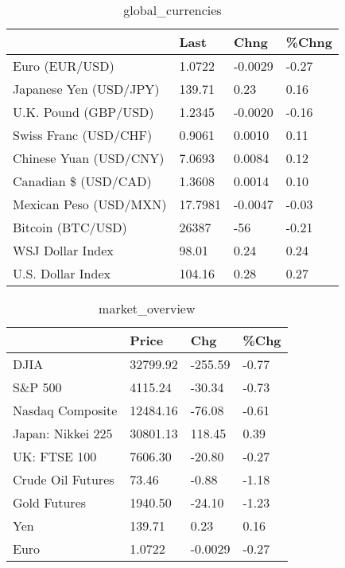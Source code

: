 \documentclass{article}%
\begin{document}
%


\begin{table}[htbp]%
\caption{global\_currencies}%
\centering%
\begin{adjustbox}{width=1\textwidth}%
\begin{tabular}{llll}
\toprule
                       &    Last &    Chng & \%Chng \\
\midrule
        Euro (EUR/USD) &  1.0722 & -0.0029 & -0.27 \\
Japanese Yen (USD/JPY) &  139.71 &    0.23 &  0.16 \\
  U.K. Pound (GBP/USD) &  1.2345 & -0.0020 & -0.16 \\
 Swiss Franc (USD/CHF) &  0.9061 &  0.0010 &  0.11 \\
Chinese Yuan (USD/CNY) &  7.0693 &  0.0084 &  0.12 \\
  Canadian \$ (USD/CAD) &  1.3608 &  0.0014 &  0.10 \\
Mexican Peso (USD/MXN) & 17.7981 & -0.0047 & -0.03 \\
     Bitcoin (BTC/USD) &   26387 &     -56 & -0.21 \\
      WSJ Dollar Index &   98.01 &    0.24 &  0.24 \\
     U.S. Dollar Index &  104.16 &    0.28 &  0.27 \\
\bottomrule
\end{tabular}
%
\end{adjustbox}%
\end{table}

%


\begin{table}[htbp]%
\caption{market\_overview}%
\centering%
\begin{adjustbox}{width=1\textwidth}%
\begin{tabular}{llll}
\toprule
                  &    Price &     Chg &  \%Chg \\
\midrule
             DJIA & 32799.92 & -255.59 & -0.77 \\
          S\&P 500 &  4115.24 &  -30.34 & -0.73 \\
 Nasdaq Composite & 12484.16 &  -76.08 & -0.61 \\
Japan: Nikkei 225 & 30801.13 &  118.45 &  0.39 \\
     UK: FTSE 100 &  7606.30 &  -20.80 & -0.27 \\
Crude Oil Futures &    73.46 &   -0.88 & -1.18 \\
     Gold Futures &  1940.50 &  -24.10 & -1.23 \\
              Yen &   139.71 &    0.23 &  0.16 \\
             Euro &   1.0722 & -0.0029 & -0.27 \\
\bottomrule
\end{tabular}
%
\end{adjustbox}%
\end{table}

%
\end{document}
